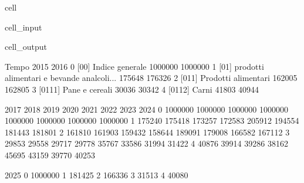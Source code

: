 \documentclass[letterpaper,10pt,english]{jupyterBook}
\begin{document}
\begin{sphinxuseclass}{cell}\begin{sphinxVerbatimInput}

\begin{sphinxuseclass}{cell_input}
\begin{sphinxVerbatim}[commandchars=\\\{\}]
\PYG{p}{[}\PYG{p}{]}
\end{sphinxVerbatim}

\end{sphinxuseclass}\end{sphinxVerbatimInput}
\begin{sphinxVerbatimOutput}

\begin{sphinxuseclass}{cell_output}
\begin{sphinxVerbatim}[commandchars=\\\{\}]
                                               Tempo     2015     2016  \PYGZbs{}
0                             [00] Indice generale    1000000  1000000   
1  [01] \PYGZhy{}\PYGZhy{} prodotti alimentari e bevande analcoli...   175648   176326   
2                        [011] Prodotti alimentari     162005   162805   
3                            [0111] Pane e cereali      30036    30342   
4                                     [0112] Carni      41803    40944   

      2017     2018     2019     2020     2021     2022     2023     2024  \PYGZbs{}
0  1000000  1000000  1000000  1000000  1000000  1000000  1000000  1000000   
1   175240   175418   173257   172583   205912   194554   181443   181801   
2   161810   161903   159432   158644   189091   179008   166582   167112   
3    29853    29558    29717    29778    35767    33586    31994    31422   
4    40876    39914    39286    38162    45695    43159    39770    40253   

      2025  
0  1000000  
1   181425  
2   166336  
3    31513  
4    40080  
\end{sphinxVerbatim}

\end{sphinxuseclass}\end{sphinxVerbatimOutput}

\end{sphinxuseclass}
\end{document}
